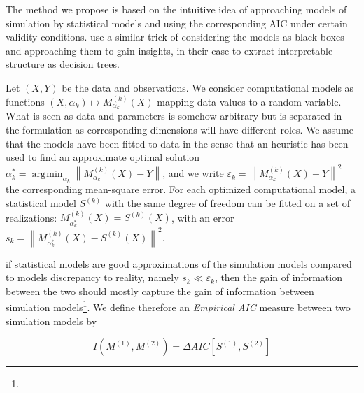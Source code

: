 \documentclass[Royal,sageh,times]{sagej}
\newcommand{\norm}[1]{\left\lVert #1 \right\rVert}
\DeclareMathOperator*{\argmin}{\arg\!\min}
\begin{document}
The method we propose is based on the intuitive idea of approaching models of simulation by statistical models and using the corresponding AIC under certain validity conditions. \cite{2017arXiv170609773B} use a similar trick of considering the models as black boxes and approaching them to gain insights, in their case to extract interpretable structure as decision trees.

Let $(X,Y)$ be the data and observations. We consider computational models as functions $(X,\alpha_k) \mapsto M_{\alpha_k}^{(k)}(X)$ mapping data values to a random variable. What is seen as data and parameters is somehow arbitrary but is separated in the formulation as corresponding dimensions will have different roles. We assume that the models have been fitted to data in the sense that an heuristic has been used to find an approximate optimal solution $\alpha^{\ast}_k = \argmin_{\alpha_k}\norm{M_{\alpha_k}^{(k)}(X) - Y}$, and we write $\varepsilon_k = \norm{M_{\alpha_k}^{(k)}(X) - Y}^2$ the corresponding mean-square error. For each optimized computational model, a statistical model $S^{(k)}$ with the same degree of freedom can be fitted on a set of realizations: $M^{(k)}_{\alpha^{\ast}_k}(X) = S^{(k)} (X)$, with an error $s_k = \norm{M_{\alpha^{\ast}_k}^{(k)}(X) - S^{(k)}(X)}^2$.

 if statistical models are good approximations of the simulation models compared to models discrepancy to reality, namely $s_k \ll \varepsilon_k$, then the gain of information between the two should mostly capture the gain of information between simulation models\footnote{}. We define therefore an \emph{Empirical AIC} measure between two simulation models by

\begin{equation}
I\left( M^{(1)}, M^{(2)}\right) = \Delta AIC \left[S^{(1)},S^{(2)}\right]
\end{equation}



\end{document}
